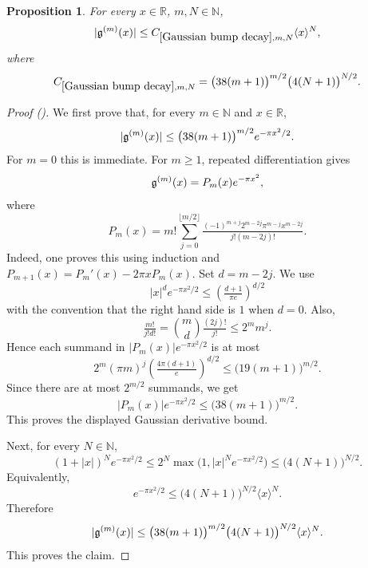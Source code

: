 \documentclass[12pt,reqno]{amsart}
\newcommand{\auto}{{({\tiny\faCar})}}
\theoremstyle{plain}
\newtheorem{proposition}[theorem]{Proposition}
\numberwithin{equation}{section}
\theoremstyle{remark}
\newcommand{\R}{{\mathbb R}}
\newcommand{\N}{{\mathbb N}}
\begin{document}
\begin{proposition}\label{Gaussian bump decay}
For every $x\in\R$, $m,N\in\N$,
\begin{equation}\label{auto:Gaussian-derivative-decay} |\mathfrak{g}^{(m)}(x)|\le C_{\ref{Gaussian bump decay},m,N} \langle x\rangle^N, \end{equation}
where
\begin{equation}\label{auto:Gaussian-bump-decay-constant}
C_{\ref{Gaussian bump decay},m,N}
=\bigl(38(m+1)\bigr)^{m/2}\bigl(4(N+1)\bigr)^{N/2}.
\end{equation}

\end{proposition}
\begin{proof}[Proof \auto]
We first prove that, for every $m\in\N$ and $x\in\R$,
\[
|\mathfrak{g}^{(m)}(x)|
\le
\bigl(38(m+1)\bigr)^{m/2}e^{-\pi x^2/2}.
\]
For $m=0$ this is immediate. For $m\ge 1$, repeated differentiation gives
\[
\mathfrak{g}^{(m)}(x)=P_m(x)e^{-\pi x^2},
\]
where
\[
P_m(x)
=
m!\sum_{j=0}^{\lfloor m/2\rfloor}
\tfrac{(-1)^{m+j}2^{m-2j}\pi^{m-j}x^{m-2j}}
{j!(m-2j)!}.
\]
Indeed, one proves this using induction and
$P_{m+1}(x)=P_m'(x)-2\pi xP_m(x).$
Set $d=m-2j$. We use
\[
|x|^d e^{-\pi x^2/2}
\le
\left(\tfrac{d+1}{\pi e}\right)^{d/2}
\]
with the convention that the right hand side is $1$ when $d=0$.
Also,
\[
\tfrac{m!}{j!d!}
=
\binom{m}{d}\tfrac{(2j)!}{j!}
\le
2^m m^j .
\]
Hence each summand in $|P_m(x)|e^{-\pi x^2/2}$ is at most
\[
2^m(\pi m)^j
\left(\tfrac{4\pi(d+1)}{e}\right)^{d/2}
\le
\bigl(19(m+1)\bigr)^{m/2}.
\]
Since there are at most $2^{m/2}$ summands, we get
\[
|P_m(x)|e^{-\pi x^2/2}
\le
\bigl(38(m+1)\bigr)^{m/2}.
\]
This proves the displayed Gaussian derivative bound.

Next, for every $N\in\N$,
\[
(1+|x|)^N e^{-\pi x^2/2}
\le
2^N\max\bigl(1,|x|^Ne^{-\pi x^2/2}\bigr)
\le
\bigl(4(N+1)\bigr)^{N/2}.
\]
Equivalently,
\[
e^{-\pi x^2/2}
\le
\bigl(4(N+1)\bigr)^{N/2}\langle x\rangle^N .
\]
Therefore
\[
|\mathfrak{g}^{(m)}(x)|
\le
\bigl(38(m+1)\bigr)^{m/2}
\bigl(4(N+1)\bigr)^{N/2}
\langle x\rangle^N.
\]
This proves the claim.
\end{proof}
\end{document}
